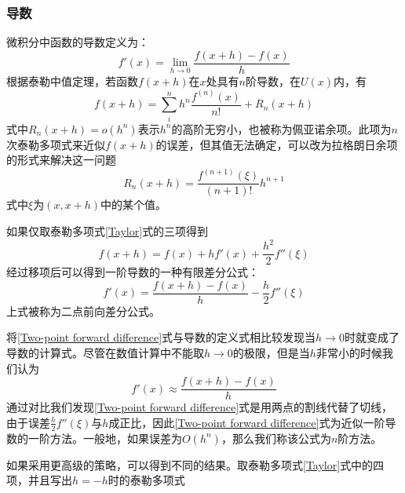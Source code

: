 \documentclass[UTF8,a4paper,10pt]{ctexart}
\begin{document}
\begin{multicols}{2}
            \subsubsection{导数}
            微积分中函数的导数定义为：
            \begin{equation}
                f'(x) = \lim_{h\to 0}\frac{f(x+h)-f(x)}{h}
            \end{equation}
            根据泰勒中值定理，若函数$f(x+h)$在$x$处具有$n$阶导数，在$U(x)$内，有
            \begin{equation}\label{Taylor}
                f(x+h) = \sum_i^nh^n\frac{f^{(n)}(x)}{n!}+R_n(x+h)
            \end{equation}
            式中$R_n(x+h)=o(h^n)$表示$h^n$的高阶无穷小，也被称为佩亚诺余项。此项为$n$次泰勒多项式来近似$f(x+h)$的误差，但其值无法确定，可以改为拉格朗日余项的形式来解决这一问题
            \begin{equation*}
                R_n(x+h) = \frac{f^{(n+1)}(\xi)}{(n+1)!}h^{n+1}
            \end{equation*}
            式中$\xi$为$(x,x+h)$中的某个值。\par
            如果仅取泰勒多项式\eqref{Taylor}式的三项得到
            \begin{equation}
                f(x+h) = f(x) + hf'(x) + \frac{h^2}{2}f''(\xi)
            \end{equation}
            经过移项后可以得到一阶导数的一种有限差分公式：
            \begin{equation}\label{Two-point forward difference}
                f'(x) = \frac{f(x+h)-f(x)}{h} - \frac{h}{2}f''(\xi)
            \end{equation}
            上式被称为二点前向差分公式。\par
            将\eqref{Two-point forward difference}式与导数的定义式相比较发现当$h\to 0$时就变成了导数的计算式。尽管在数值计算中不能取$h\to 0$的极限，但是当$h$非常小的时候我们认为
            \begin{equation}
                f'(x) \approx \frac{f(x+h)-f(x)}{h}
            \end{equation}
            通过对比我们发现\eqref{Two-point forward difference}式是用两点的割线代替了切线，由于误差$\frac{h}{2}f''(\xi)$与$h$成正比，因此\eqref{Two-point forward difference}式为近似一阶导数的一阶方法。一般地，如果误差为$O(h^n)$，那么我们称该公式为$n$阶方法。\par
            如果采用更高级的策略，可以得到不同的结果。取泰勒多项式\eqref{Taylor}式中的四项，并且写出$h=-h$时的泰勒多项式

\end{multicols}
\end{document}
